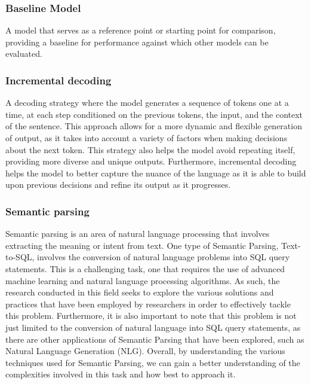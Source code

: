 \subsubsection{Baseline Model}

A model that serves as a reference point or starting point for comparison, providing a baseline for performance against which other models can be evaluated.

\subsubsection{Incremental decoding}

A decoding strategy where the model generates a sequence of tokens one at a time, at each step conditioned on the previous tokens, the input, and the context of the sentence. This approach allows for a more dynamic and flexible generation of output, as it takes into account a variety of factors when making decisions about the next token. This strategy also helps the model avoid repeating itself, providing more diverse and unique outputs. Furthermore, incremental decoding helps the model to better capture the nuance of the language as it is able to build upon previous decisions and refine its output as it progresses\cite{huang-mi-2010-efficient}.

\subsubsection{Semantic parsing}

Semantic parsing\cite{krishnamurthy-etal-2017-neural} is an area of natural language processing that involves extracting the meaning or intent from text. One type of Semantic Parsing, Text-to-SQL, involves the conversion of natural language problems into SQL query statements. This is a challenging task, one that requires the use of advanced machine learning and natural language processing algorithms. As such, the research conducted in this field seeks to explore the various solutions and practices that have been employed by researchers in order to effectively tackle this problem. Furthermore, it is also important to note that this problem is not just limited to the conversion of natural language into SQL query statements, as there are other applications of Semantic Parsing that have been explored, such as Natural Language Generation (NLG). Overall, by understanding the various techniques used for Semantic Parsing, we can gain a better understanding of the complexities involved in this task and how best to approach it.